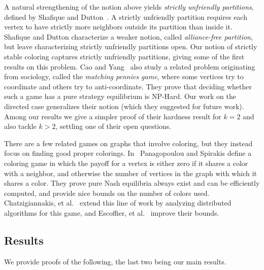 A natural strengthening of the notion above yields \emph{strictly unfriendly
partitions},  defined by Shafique and Dutton~\cite{ShafiqueD09}.  A strictly
unfriendly partition requires each vertex to have strictly more neighbors
outside its partition than inside it.  Shafique and Dutton characterize a
weaker notion, called \emph{alliance-free partition}, but leave characterizing
strictly unfriendly partitions open.  Our notion of strictly stable coloring
captures strictly unfriendly partitions, giving some of the first results on
this problem.  Cao and Yang~\cite{CaoY12a} also study a related problem
originating from sociology, called the \emph{matching pennies game}, where some
vertices try to coordinate and others try to anti-coordinate.  They prove that
deciding whether such a game has a pure strategy equilibrium is NP-Hard.  Our
work on the directed case generalizes their notion (which they suggested for
future work).  Among our results we give a simpler proof of their hardness
result for $k=2$ and also tackle  $k >2$, settling one of their open questions.

There are a few related games on graphs that involve coloring, but they instead
focus on finding good proper colorings. In~\cite{PS08} Panagopoulou and
Spirakis define a coloring game in which the payoff for a vertex is either zero
if it shares a color with a neighbor, and otherwise the number of vertices in
the graph with which it shares a color. They prove pure Nash equilibria always
exist and can be efficiently computed, and provide nice bounds on the number of
colors used. Chatzigiannakis, et al.~\cite{CKPS10} extend this line of work by
analyzing distributed algorithms for this game, and Escoffier, et
al.~\cite{EGM12} improve their bounds. 

\subsection{Results}

We provide proofs of the following, the last two being our main results.

